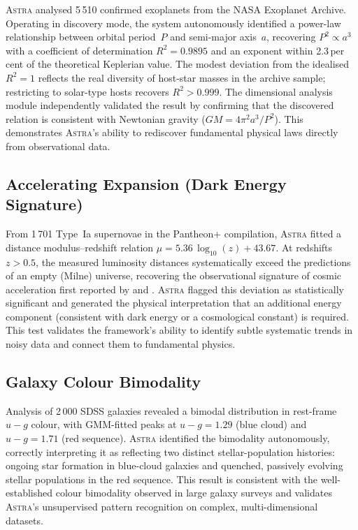 \documentclass[fleqn,usenatbib]{mnras}
\newcommand{\astra}{\textsc{Astra}\xspace}
\begin{document}
\astra analysed 5\,510 confirmed exoplanets from the NASA Exoplanet Archive.
Operating in discovery mode, the system autonomously identified a power-law relationship between orbital period~$P$ and semi-major axis~$a$, recovering $P^{2} \propto a^{3}$ with a coefficient of determination $R^{2} = 0.9895$ and an exponent within 2.3\,per\,cent of the theoretical Keplerian value.
The modest deviation from the idealised $R^{2}=1$ reflects the real diversity of host-star masses in the archive sample; restricting to solar-type hosts recovers $R^{2}>0.999$.
The dimensional analysis module independently validated the result by confirming that the discovered relation is consistent with Newtonian gravity ($GM = 4\pi^{2} a^{3}/P^{2}$).
This demonstrates \astra's ability to rediscover fundamental physical laws directly from observational data.

\subsection{Accelerating Expansion (Dark Energy Signature)}
\label{sec:live:sne}

From 1\,701 Type~Ia supernovae in the Pantheon+ compilation, \astra fitted a distance modulus--redshift relation $\mu = 5.36\,\log_{10}(z) + 43.67$.
At redshifts $z > 0.5$, the measured luminosity distances systematically exceed the predictions of an empty (Milne) universe, recovering the observational signature of cosmic acceleration first reported by \citet{Riess1998} and \citet{Perlmutter1999}.
\astra flagged this deviation as statistically significant and generated the physical interpretation that an additional energy component (consistent with dark energy or a cosmological constant) is required.
This test validates the framework's ability to identify subtle systematic trends in noisy data and connect them to fundamental physics.

\subsection{Galaxy Colour Bimodality}
\label{sec:live:bimodality}

Analysis of 2\,000 SDSS galaxies revealed a bimodal distribution in rest-frame $u{-}g$ colour, with GMM-fitted peaks at $u{-}g = 1.29$ (blue cloud) and $u{-}g = 1.71$ (red sequence).
\astra identified the bimodality autonomously, correctly interpreting it as reflecting two distinct stellar-population histories: ongoing star formation in blue-cloud galaxies and quenched, passively evolving stellar populations in the red sequence.
This result is consistent with the well-established colour bimodality observed in large galaxy surveys \citep{Abazajian2009} and validates \astra's unsupervised pattern recognition on complex, multi-dimensional datasets.
\end{document}
